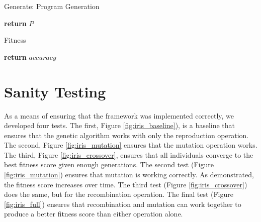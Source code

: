 \documentclass[12pt, final]{dalcsthesis}
\begin{document}
\begin{algorithm}[hb]
	\caption{Generate: Program Generation}
	\label{alg:generate}
	\begin{algorithmic}[1]
		\State \textbf{return} $P$
		\EndProcedure
	\end{algorithmic}
\end{algorithm}

\begin{algorithm}[hb]
	\caption{Fitness}
	\label{alg:fitness-baseline}
	\begin{algorithmic}[1]
		\EndIf
		\EndFor
		\State \textbf{return} $accuracy$
		\EndProcedure
	\end{algorithmic}
\end{algorithm}

\section{Sanity Testing}
As a means of ensuring that the framework was implemented correctly, we developed four tests.
The first, Figure \ref{fig:iris_baseline}), is a baseline that ensures that the genetic algorithm works with only the reproduction operation. The second,
Figure \ref{fig:iris_mutation} ensures that the mutation operation works. The third, Figure \ref{fig:iris_crossover}, ensures that
all individuals converge to the best fitness score given enough generations. The second test (Figure \ref{fig:iris_mutation})
ensures that mutation is working correctly. As demonstrated, the fitness score increases over time. The third test (Figure \ref{fig:iris_crossover})
does the same, but for the recombination operation. The final test (Figure \ref{fig:iris_full}) ensures that recombination and mutation can work together to produce a better fitness score than either operation alone.
\end{document}
